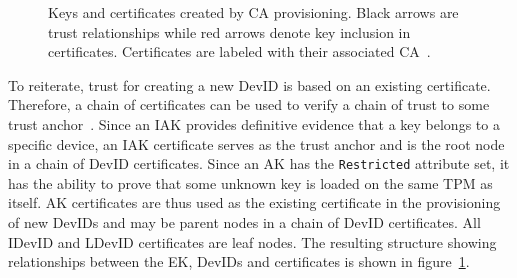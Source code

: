 \documentclass[runningheads]{llncs}
\begin{document}

\begin{figure}[hbtp]
  \centering
  
  \caption{Keys and certificates created by CA provisioning.
    Black arrows are trust relationships while red
    arrows denote key inclusion in certificates. Certificates are
    labeled with their associated CA~\citep{DevIDSpec-TCG}.}
  \label{fig:cert_rel}
\end{figure}

To reiterate, trust for creating a new DevID is based on an existing 
certificate. Therefore, a chain of certificates can be used to verify 
a chain of trust to some trust anchor~\citep{DevIDSpec-TCG}.
Since an IAK provides definitive evidence that a key belongs to a 
specific device, an IAK certificate serves as the trust anchor 
and is the root node in a chain of DevID certificates. Since an AK has 
the \verb|Restricted| attribute set, it has the ability to prove that 
some unknown key is loaded on the same TPM as itself.  AK certificates 
are thus used as the existing certificate in the provisioning of new DevIDs
and may be parent nodes in a chain of DevID certificates. 
All IDevID and LDevID certificates are leaf nodes.
The resulting structure showing relationships between the EK, DevIDs 
and certificates is shown in figure~\ref{fig:cert_rel}.

\end{document}
